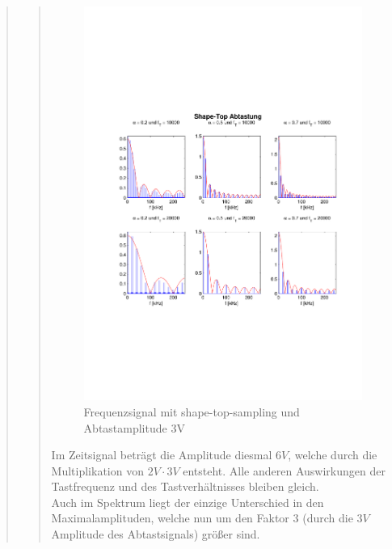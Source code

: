 \begin{quote}
\begin{quote}
  	    
  	    \begin{figure}[H]
        \centering
        \includegraphics[scale=0.7, trim = 1.5cm 6cm 1cm 8cm,
        clip]{./Bilder/shape-top-freq_3V}
            \caption{Frequenzsignal mit shape-top-sampling und Abtastamplitude
            3V}
  	    \end{figure}
  	    
  	    
  	    Im Zeitsignal beträgt die Amplitude diesmal $6V$, welche durch die
  	    Multiplikation von $2V \cdot 3V$ entsteht. Alle anderen Auswirkungen der
  	    Tastfrequenz und des Tastverhältnisses bleiben gleich.\\
  	    Auch im Spektrum liegt der einzige Unterschied in den Maximalamplituden,
  	    welche nun um den Faktor $3$ (durch die $3V$ Amplitude des Abtastsignals)
  	    größer sind.
  	    
  	    \vspace{1em}
  	    

\end{quote}
\end{quote}
